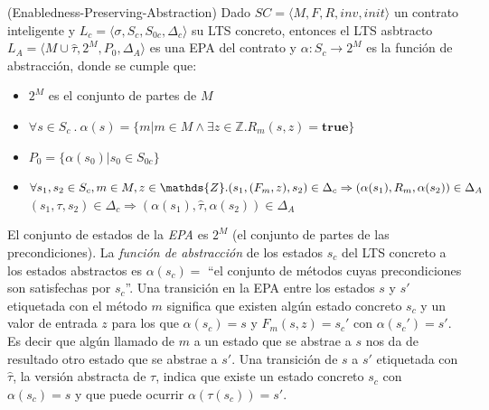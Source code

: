 \begin{definition}\label{definicion-epa}(Enabledness-Preserving-Abstraction) Dado $SC = \langle M, F, R, inv, init \rangle$ un contrato inteligente y $L_c = \langle \sigma , S_c, S_{0c}, \Delta _c \rangle$ su LTS concreto, entonces el LTS asbtracto $L_A = \langle M \cup \hat{\tau} , 2^M, P_0, \Delta _A \rangle$ es una EPA del contrato y $\alpha : S_c \rightarrow 2^M$ es la función de abstracción, donde se cumple que:
    \begin{itemize}
        \item $2^M$ es el conjunto de partes de $M$
        \item $\forall s \in S_c \: . \:
                  \alpha(s) = \{m | m \in M \land \exists z \in \mathds{Z} . R_m(s,z) = \textbf{true}\}$
        \item $P_0 = \{\alpha(s_0) | s_0 \in S_{0c} \}$
        \item $\forall s_1,s_2 \in S_c, m \in M, z \in \mathds{Z} . \\ (s_1,(F_m,z),s_2) \in \Delta _c \Rightarrow (\alpha(s_1),R_m,\alpha(s_2)) \in \Delta _A$ \\
              $(s_1,\tau,s_2) \in \Delta _c \Rightarrow (\alpha(s_1),\hat{\tau},\alpha(s_2)) \in \Delta _A$
    \end{itemize}
\end{definition}

El conjunto de estados de la \textit{EPA} es $2^M$ (el conjunto de partes de las precondiciones).
La \textit{función de abstracción} de los estados $s_c$ del LTS concreto a los estados abstractos es $\alpha (s_c) = $ ``el conjunto de métodos cuyas precondiciones son satisfechas por $s_c$''.
Una transición en la EPA entre los estados $s$ y $s'$ etiquetada con el método $m$ significa que existen algún estado concreto $s_c$ y un valor de entrada $z$ para los que $\alpha(s_c) = s$ y  $F_m(s,z)=s_c'$ con $\alpha(s_c') = s'$.
Es decir que algún llamado de $m$ a un estado que se abstrae a $s$ nos da de resultado otro estado que se abstrae a $s'$.
Una transición de $s$ a $s'$ etiquetada  con $\hat{\tau}$, la versión abstracta de $\tau$, indica que existe un estado concreto $s_c$ con $\alpha(s_c) = s$ y que puede ocurrir $\alpha (\tau (s_c)) = s'$.
